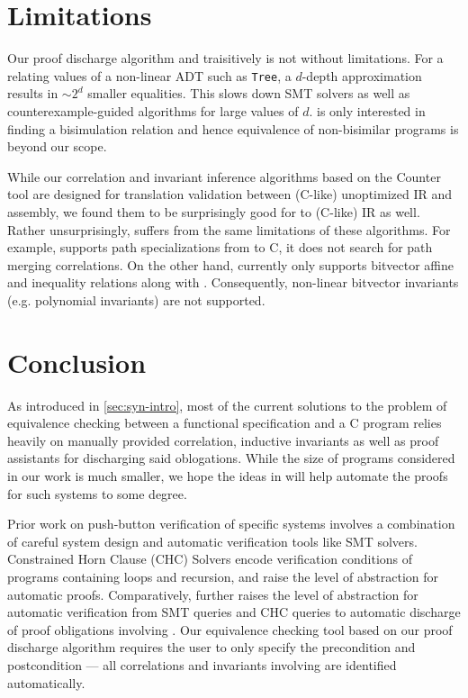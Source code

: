 \section{Limitations}
\label{sec:syn-limitations}
Our proof discharge algorithm and traisitively \toolName{} is not without limitations.
For a \recursiveRelation{} relating values of a non-linear ADT such as {\tt Tree}, a $d$-depth
approximation results in $\sim 2^d$ smaller equalities. This slows down SMT solvers as well as
counterexample-guided algorithms for large values of $d$.
\toolName{} is only interested in finding a bisimulation relation and hence
equivalence of non-bisimilar programs is beyond our scope.

While our correlation and invariant inference algorithms based on the Counter tool \cite{oopsla20}
are designed for translation validation between (C-like) unoptimized IR and assembly, we found them
to be surprisingly good for \SpecL{} to (C-like) IR as well. Rather unsurprisingly, \toolName{}
suffers from the same limitations of these algorithms. For example, \toolName{} supports path
specializations from \SpecL{} to C, it does not search for path merging correlations.
On the other hand, \toolName{} currently only supports bitvector affine and inequality relations
along with \recursiveRelations{}. Consequently, non-linear bitvector
invariants (e.g. polynomial invariants) are not supported.

\section{Conclusion}
\label{sec:syn-conclusion}
As introduced in \cref{sec:syn-intro}, most of the current solutions
to the problem of equivalence checking between a functional specification
and a C program relies heavily on manually provided correlation, inductive
invariants as well as proof assistants for discharging said oblogations.
While the size of programs considered in our work is much smaller,
we hope the ideas in \toolName{} will help
automate the proofs for such systems to some degree.

Prior work on push-button verification of specific
systems \cite{fscq,hyperkernel,serval,verifiedBPF}
involves a combination of careful system design and
automatic verification tools like SMT solvers.
Constrained Horn Clause (CHC) Solvers \cite{CHCeq}
encode verification conditions of programs containing loops and recursion,
and raise the level of abstraction for automatic proofs.
Comparatively, \toolName{} further raises the level
of abstraction for automatic verification from
SMT queries and CHC queries to automatic discharge of
proof obligations involving \recursiveRelations{}.
Our equivalence checking tool based on
our proof discharge algorithm requires the user
to only specify the precondition and
postcondition --- all
correlations and invariants involving \recursiveRelations{}
are identified automatically.

